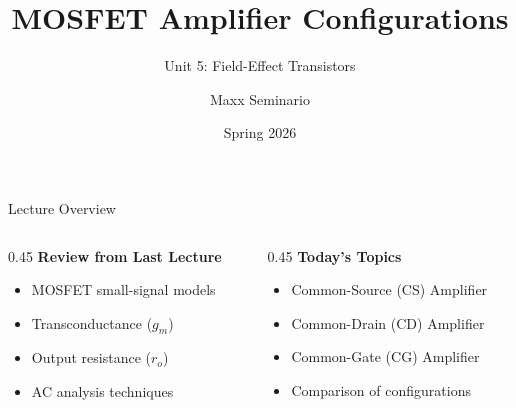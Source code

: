 \documentclass[10pt, aspectratio=169]{beamer}
\title{MOSFET Amplifier Configurations}
\subtitle{Unit 5: Field-Effect Transistors}
\author{Maxx Seminario}
\institute{University of Nebraska-Lincoln}
\date{Spring 2026}
\begin{document}
\begin{frame}
  \titlepage
\end{frame}

\begin{frame}{Lecture Overview}
\begin{columns}[T]
\begin{column}{0.45\textwidth}
\textbf{Review from Last Lecture}
\begin{itemize}
\item MOSFET small-signal models
\item Transconductance ($g_m$)
\item Output resistance ($r_o$)
\item AC analysis techniques
\end{itemize}
\end{column}

\begin{column}{0.45\textwidth}
\textbf{Today's Topics}
\begin{itemize}
\item Common-Source (CS) Amplifier
\item Common-Drain (CD) Amplifier
\item Common-Gate (CG) Amplifier
\item Comparison of configurations
\end{itemize}
\end{column}
\end{columns}
\end{frame}

\end{document}
